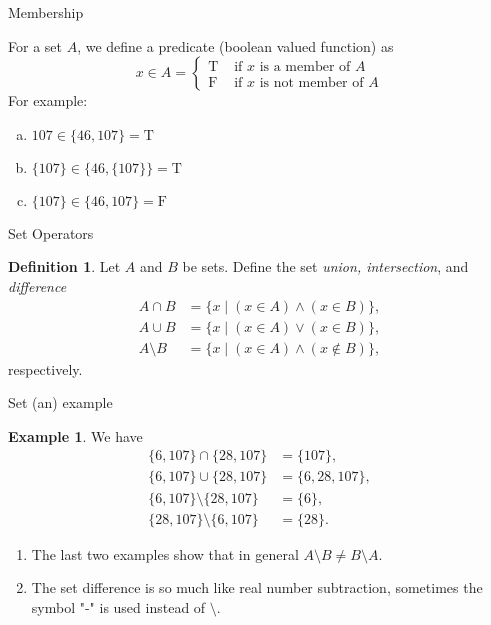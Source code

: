 \documentclass[fleqn]{beamer}
\theoremstyle{definition}
\newtheorem{mydef}{Definition}
\newtheorem{myex}{Example}
\newenvironment{alphalist}{
  \begin{enumerate}[(a)]
    \addtolength{\itemsep}{1.0\itemsep}}
  {\end{enumerate}}
\newenvironment{checklist}{
  \begin{enumerate}[\ding{51}]
    \addtolength{\itemsep}{-0.0\itemsep}}
  {\end{enumerate}}
\begin{document}
\begin{frame}{Membership}

For a set $A$, we define a predicate (boolean valued function) as
\[
   x \in A = \begin{cases} \mathrm{T} & \mbox{ if }  x  \mbox{ is a member of } A \\
                                     \mathrm{F} &  \mbox{ if } x \mbox{ is not  member of } A   
                                     \end{cases}          
\]
For example:

\begin{alphalist}
\item $ 107 \in \{46, 107\} = \mathrm{T}$
\item $ \{107 \} \in \{46, \{107 \} \} = \mathrm{T}$
\item $ \{107 \} \in \{46, 107 \} = \mathrm{F}$
\end{alphalist}

\end{frame}

\begin{frame}{Set Operators}

\begin{mydef}
Let \(A\) and \(B\) be sets. Define the set \emph{union, intersection}, and \emph{difference}
\begin{align*}
   A \cap B &= \{x  \mid  (x \in A)\land (x \in B) \}, \\
   A \cup B &= \{x  \mid (x \in A) \lor (x \in B) \}, \\
   A \setminus B &= \{x  \mid  (x \in A) \land (x \notin B) \},
\end{align*}
respectively.
\end{mydef}
\end{frame}

\begin{frame}{Set (an) example}

\begin{myex}
We have
\begin{align*}
   \{6, 107\} \cap  \{28,107\} &= \{107\}, \\
      \{6, 107\} \cup  \{28,107\} &= \{6,28, 107\}, \\
         \{6, 107\} \setminus  \{28,107\} &= \{6\}, \\
            \{28, 107\} \setminus  \{6,107\} &= \{28\}.
\end{align*}
\end{myex}

\begin{checklist}

\item The last two examples show that in  general  \(A \setminus B \neq B \setminus A\).

\item The set difference is so much like real number subtraction, sometimes the symbol "-" is used instead of \(\setminus\).

\end{checklist}
\end{frame}
\end{document}

